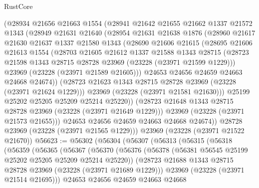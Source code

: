 \begin{lexlean}{RustCore}
\begin{coremodule}
        (@28934
          @21656
          @21663
          @1554
          (@28941
            @21642
            @21655
            @21662
            @1337
            @21572
            @1343
            (@28949
              @21631
              @21640
              (@28954
                @21631
                @21638
                @1876
                (@28960
                  @21617
                  @21630
                  @21637
                  @1337
                  @21580
                  @1343
                  (@28690
                    @21606
                    @21615
                    (@28695
                      @21606
                      @21613
                      @1554
                      (@28703
                        @21605
                        @21612
                        @1337
                        @21588
                        @1343
                        @28715
                        (@28723 @21598 @1343 @28715 @28728 @23969 (@23228 (@23971 @21599 @1229)))
                        @23969
                        (@23228 (@23971 @21589 @21605)))
                      @24653
                      @24656
                      @24659
                      @24663
                      @24668
                      @24674))
                  (@28723 @21623 @1343 @28715 @28728 @23969 (@23228 (@23971 @21624 @1229)))
                  @23969
                  (@23228 (@23971 @21581 @21630)))
                @25199
                @25202
                @25205
                @25209
                @25214
                @25220))
            (@28723 @21648 @1343 @28715 @28728 @23969 (@23228 (@23971 @21649 @1229)))
            @23969
            (@23228 (@23971 @21573 @21655)))
          @24653
          @24656
          @24659
          @24663
          @24668
          @24674))
      @28728
      @23969
      (@23228 (@23971 @21565 @1229)))
    @23969
    (@23228 (@23971 @21522 @21670))
@56623 := @56302
    (@56304
      (@56307
        (@56313
          (@56315
            (@56318
              (@56359
                (@56365
                  (@56367
                    (@56370
                      (@56376
                        (@56378 (@56381 @56545 @25199 @25202 @25205 @25209 @25214 @25220))
                        (@28723 @21688 @1343 @28715 @28728 @23969 (@23228 (@23971 @21689 @1229)))
                        @23969
                        (@23228 (@23971 @21514 @21695)))
                      @24653
                      @24656
                      @24659
                      @24663
                      @24668

\end{coremodule}
\end{lexlean}
